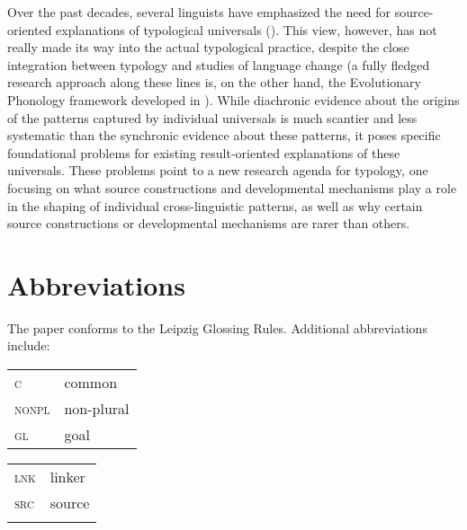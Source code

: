 \documentclass[output=paper]{langsci/langscibook}
\begin{document}
Over the past decades, several linguists have emphasized the need for
source-oriented explanations of typological universals (\citealt{Bybee1988_Diachr,Bybee2006_Univ,Bybee2008_StructPres,Aristar1991_Diachr,Gildea1998_Carib,Otareferential,Otacompetingmotivations,Otadependencies,Anderson2016_Change}). This
view, however, has not really made its way into the actual typological
practice, despite the close integration between typology and studies
of language change (a fully fledged research approach along these lines is, on
the other hand, the Evolutionary Phonology framework developed in
\citealt{Blevins2004}). While diachronic evidence about the origins
of the patterns captured by individual universals is much scantier and
less systematic than the synchronic evidence about these patterns, 
 it poses specific foundational problems for existing result-oriented explanations of these universals. These problems point to a
new research agenda for typology, one  focusing on what source constructions and developmental
mechanisms play a role in the shaping of individual cross-linguistic
patterns, as well as why certain source
constructions or developmental mechanisms are rarer than others.

\section*{Abbreviations}
 
The paper conforms to the Leipzig Glossing Rules. Additional abbreviations include:\smallskip
  
\begin{tabularx}{.45\textwidth}{lQ}
\textsc{c} &{common}              \\
\textsc{nonpl}&{non-plural}       \\
\textsc{gl}&{goal}                \\
\end{tabularx}
\begin{tabularx}{.45\textwidth}{lQ}
\textsc{lnk}&{linker}              \\
\textsc{src}&{source}              \\
\\
\end{tabularx}


 
\sloppy
\printbibliography[heading=subbibliography,notkeyword=this] 
\end{document}
